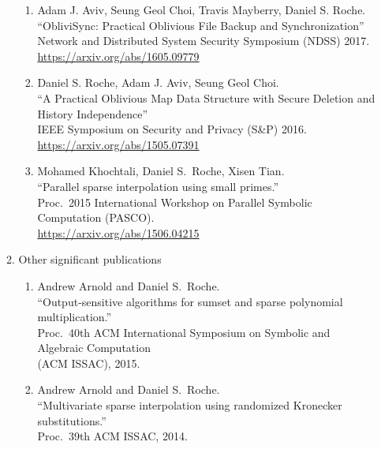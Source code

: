 \documentclass[letterpaper,10pt]{article}
\begin{document}
\begin{enumerate}[label=\textbf{(\alph*)}]
\begin{enumerate}[label=(\roman*)]
\begin{enumerate}[label=\arabic*.]
        \item Adam J. Aviv, Seung Geol Choi, Travis Mayberry, Daniel S.
        Roche.\\
          ``ObliviSync: Practical Oblivious File Backup and
          Synchronization''\\
          Network and Distributed System Security Symposium (NDSS)
          2017.\\
          \url{https://arxiv.org/abs/1605.09779}

        \item Daniel S. Roche, Adam J. Aviv, Seung Geol Choi.\\
          ``A Practical Oblivious Map Data Structure with Secure
          Deletion and History Independence''\\
          IEEE Symposium on Security and Privacy (S\&P) 2016.\\
          \url{https://arxiv.org/abs/1505.07391}

        \item Mohamed Khochtali, Daniel S.\ Roche, Xisen Tian.\\
          ``Parallel sparse interpolation using small primes.''\\
          Proc.\ 2015 International Workshop on Parallel Symbolic
          Computation (PASCO).\\
          \url{https://arxiv.org/abs/1506.04215}

      \end{enumerate}

    \item Other significant publications
      \begin{enumerate}[label=\arabic*.]
        \item Andrew Arnold and Daniel S.\ Roche.\\
          ``Output-sensitive algorithms for sumset and sparse polynomial
          multiplication.'' \\
          Proc.\ 40th ACM International Symposium on Symbolic and
          Algebraic Computation\\ (ACM ISSAC), 2015.

        \item Andrew Arnold and Daniel S.\ Roche.\\
          ``Multivariate sparse interpolation using randomized Kronecker
          substitutions.'' \\
          Proc.\ 39th ACM ISSAC, 2014.


\end{enumerate}
\end{enumerate}
\end{enumerate}
\end{document}

